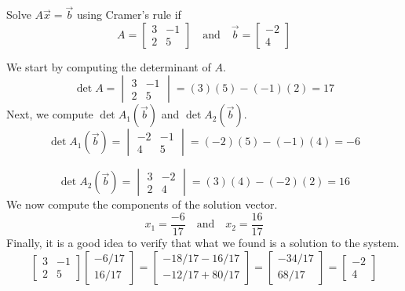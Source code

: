\documentclass{ximera}
\begin{document}
\begin{example}\label{ex:cramer2by2}
Solve $A\vec{x}=\vec{b}$ using Cramer's rule if
$$A=\begin{bmatrix}3&-1\\2&5\end{bmatrix}\quad\text{and}\quad \vec{b}=\begin{bmatrix}-2\\4\end{bmatrix}$$

\begin{explanation}
We start by computing the determinant of $A$.
$$\det{A}=\begin{vmatrix}3&-1\\2&5\end{vmatrix}=(3)(5)-(-1)(2)=17$$
Next, we compute $\det{A_1(\vec{b})}$ and $\det{A_2(\vec{b})}$.
$$\det{A_1(\vec{b})}=\begin{vmatrix}-2&-1\\4&5\end{vmatrix}=(-2)(5)-(-1)(4)=-6$$

$$\det{A_2(\vec{b})}=\begin{vmatrix}3&-2\\2&4\end{vmatrix}=(3)(4)-(-2)(2)=16$$
We now compute the components of the solution vector.
$$x_1=\frac{-6}{17}\quad\text{and}\quad x_2=\frac{16}{17}$$
Finally, it is a good idea to verify that what we found is a solution to the system.
$$\begin{bmatrix}3&-1\\2&5\end{bmatrix}\begin{bmatrix}-6/17\\16/17\end{bmatrix}=\begin{bmatrix}-18/17-16/17\\-12/17+80/17\end{bmatrix}=\begin{bmatrix}-34/17\\68/17\end{bmatrix}=\begin{bmatrix}-2\\4\end{bmatrix}$$
\end{explanation}
\end{example}
\end{document}
